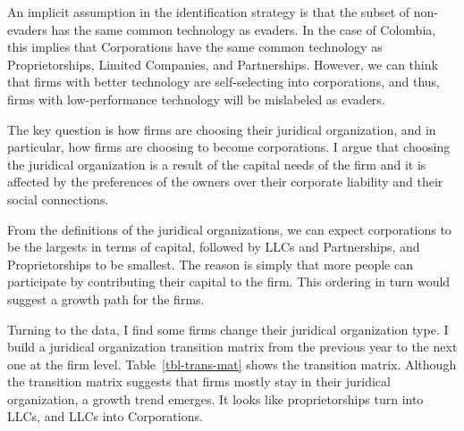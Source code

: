 \documentclass[
  12pt]{article}
\theoremstyle{definition}
\theoremstyle{remark}
\begin{document}
An implicit assumption in the identification strategy is that the subset
of non-evaders has the same common technology as evaders. In the case of
Colombia, this implies that Corporations have the same common technology
as Proprietorships, Limited Companies, and Partnerships. However, we can
think that firms with better technology are self-selecting into
corporations, and thus, firms with low-performance technology will be
mislabeled as evaders.

The key question is how firms are choosing their juridical organization,
and in particular, how firms are choosing to become corporations. I
argue that choosing the juridical organization is a result of the
capital needs of the firm and it is affected by the preferences of the
owners over their corporate liability and their social connections.

From the definitions of the juridical organizations, we can expect
corporations to be the largests in terms of capital, followed by LLCs
and Partnerships, and Proprietorships to be smallest. The reason is
simply that more people can participate by contributing their capital to
the firm. This ordering in turn would suggest a growth path for the
firms.

Turning to the data, I find some firms change their juridical
organization type. I build a juridical organization transition matrix
from the previous year to the next one at the firm level.
Table~\ref{tbl-trans-mat} shows the transition matrix. Although the
transition matrix suggests that firms mostly stay in their juridical
organization, a growth trend emerges. It looks like proprietorships turn
into LLCs, and LLCs into Corporations.

\begin{table}

\caption{\label{tbl-trans-mat}Transition Matrix}


\end{table}%
\end{document}
